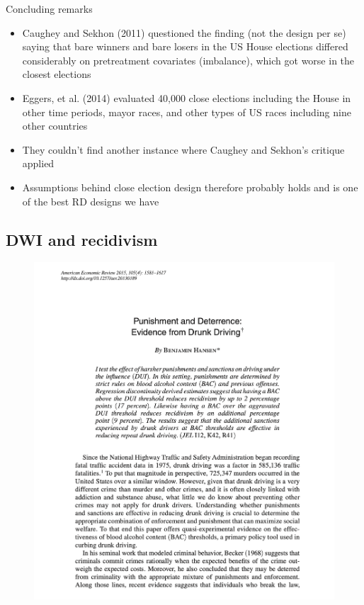 \documentclass{beamer}
\begin{document}
\begin{frame}{Concluding remarks}

\begin{itemize}
\item Caughey and Sekhon (2011) questioned the finding (not the design per se) saying that bare winners and bare losers in the US House elections differed considerably on pretreatment covariates (imbalance), which got worse in the closest elections
\item Eggers, et al. (2014) evaluated 40,000 close elections including the House in other time periods, mayor races, and other types of US races including nine other countries
\item They couldn't find another instance where Caughey and Sekhon's critique applied
\item Assumptions behind close election design therefore probably holds and is one of the best RD designs we have
\end{itemize}

\end{frame}

\subsection{DWI and recidivism}

\begin{frame}

	\begin{figure}
	\includegraphics[scale=0.35]{./lecture_includes/hansen_aer_fig}
	\end{figure}
\end{frame}
\end{document}
